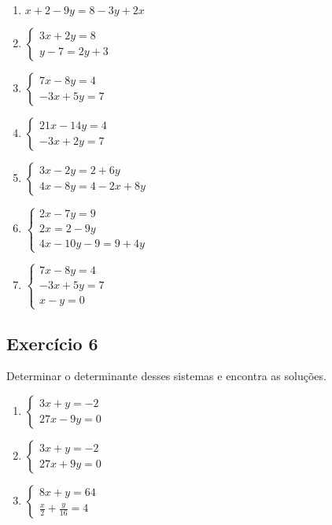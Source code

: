 \begin{enumerate}
\item $x + 2 - 9y = 8 - 3y + 2x$
\item $\left\{\begin{aligned}
  3x + 2y = 8 \\
  y - 7 = 2y + 3
\end{aligned}\right.$
\item $\left\{\begin{aligned}
   7x  - 8y = 4 \\
  -3x + 5y = 7
\end{aligned}\right.$

\item $\left\{\begin{aligned}
   21x  - 14y = 4 \\
  -3x + 2y = 7
\end{aligned}\right.$

\item $\left\{\begin{aligned}
   3x-2y=2+6y \\
  4x-8y=4-2x+8y
\end{aligned}\right.$

\item $\left\{\begin{aligned}
   2x-7y=9 \\
  2x=2-9y \\
  4x-10y-9=9+4y
\end{aligned}\right.$

\item $\left\{\begin{aligned}
   7x  - 8y = 4 \\
  -3x + 5y = 7 \\
  x - y = 0
\end{aligned}\right.$

\end{enumerate}

\subsection*{Exercício 6}

Determinar o determinante desses sistemas e encontra as soluções.

\begin{enumerate}
\item $\left\{\begin{aligned}
  3x+y=-2 \\
  27x-9y=0
\end{aligned}\right.$
\item $\left\{\begin{aligned} 3x+y=-2\\ 27x+9y=0\end{aligned}\right.$
\item $\left\{\begin{aligned} 8x+y=64\\ \frac{x}{2}+\frac{y}{16}=4\end{aligned}\right.$
\end{enumerate}

